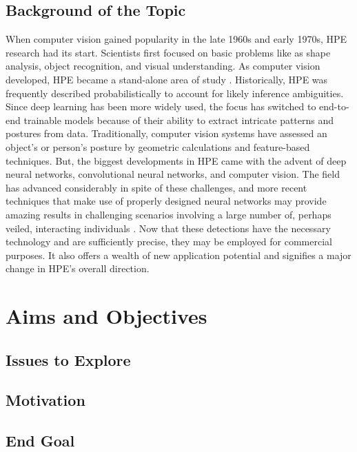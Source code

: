 \documentclass[runningheads]{llncs}
\begin{document}
    \subsection{Background of the Topic}
        When computer vision gained popularity in the late 1960s and early 1970s, HPE research had its start. Scientists first focused on basic problems like as shape analysis, object recognition, and visual understanding. As computer vision developed, HPE became a stand-alone area of study \parencite{Roboflow}. Historically, HPE was frequently described probabilistically to account for likely inference ambiguities. Since deep learning has been more widely used, the focus has switched to end-to-end trainable models because of their ability to extract intricate patterns and postures from data. Traditionally, computer vision systems have assessed an object's or person's posture by geometric calculations and feature-based techniques. But, the biggest developments in HPE came with the advent of deep neural networks, convolutional neural networks, and computer vision. The field has advanced considerably in spite of these challenges, and more recent techniques that make use of properly designed neural networks may provide amazing results in challenging scenarios involving a large number of, perhaps veiled, interacting individuals \parencite{liu2018recognizing}. Now that these detections have the necessary technology and are sufficiently precise, they may be employed for commercial purposes. It also offers a wealth of new application potential and signifies a major change in HPE's overall direction.



\section{Aims and Objectives}
    \subsection{Issues to Explore}

    \subsection{Motivation}

    \subsection{End Goal}
\end{document}
